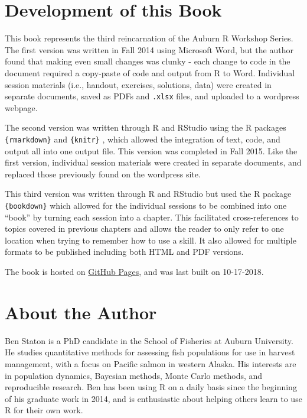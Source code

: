 \documentclass[]{book}
\theoremstyle{definition}
\theoremstyle{definition}
\theoremstyle{definition}
\theoremstyle{remark}
\begin{document}
\section*{Development of this Book}\label{development-of-this-book}

This book represents the third reincarnation of the Auburn R Workshop
Series. The first version was written in Fall 2014 using Microsoft Word,
but the author found that making even small changes was clunky - each
change to code in the document required a copy-paste of code and output
from R to Word. Individual session materials (i.e., handout, exercises,
solutions, data) were created in separate documents, saved as PDFs and
\texttt{.xlsx} files, and uploaded to a wordpress webpage.

The second version was written through R \citep{R-base} and RStudio
using the R packages \texttt{\{rmarkdown\}} \citep{R-rmarkdown} and
\texttt{\{knitr\}} \citep{R-knitr, knitr-cite}, which allowed the
integration of text, code, and output all into one output file. This
version was completed in Fall 2015. Like the first version, individual
session materials were created in separate documents, and replaced those
previously found on the wordpress site.

This third version was written through R and RStudio but used the R
package \texttt{\{bookdown\}} \citep{R-bookdown} which allowed for the
individual sessions to be combined into one ``book'' by turning each
session into a chapter. This facilitated cross-references to topics
covered in previous chapters and allows the reader to only refer to one
location when trying to remember how to use a skill. It also allowed for
multiple formats to be published including both HTML and PDF versions.

The book is hosted on \href{https://pages.github.com/}{GitHub Pages},
and was last built on 10-17-2018.

\section*{About the Author}\label{about-the-author}

Ben Staton is a PhD candidate in the School of Fisheries at Auburn
University. He studies quantitative methods for assessing fish
populations for use in harvest management, with a focus on Pacific
salmon in western Alaska. His interests are in population dynamics,
Bayesian methods, Monte Carlo methods, and reproducible research. Ben
has been using R on a daily basis since the beginning of his graduate
work in 2014, and is enthusiastic about helping others learn to use R
for their own work.
\end{document}
